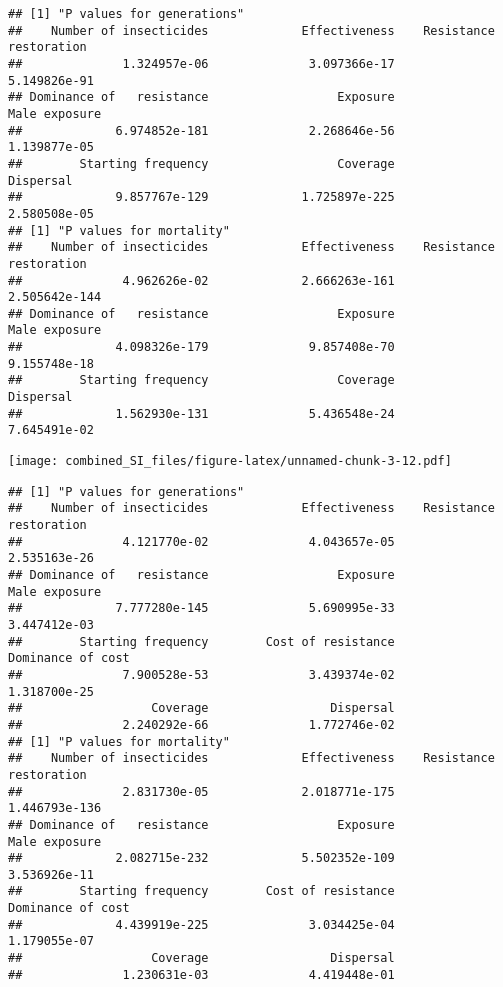 \documentclass[
]{article}
\begin{document}
\begin{verbatim}
## [1] "P values for generations"
##    Number of insecticides             Effectiveness    Resistance restoration 
##              1.324957e-06              3.097366e-17              5.149826e-91 
## Dominance of   resistance                  Exposure             Male exposure 
##             6.974852e-181              2.268646e-56              1.139877e-05 
##        Starting frequency                  Coverage                 Dispersal 
##             9.857767e-129             1.725897e-225              2.580508e-05 
## [1] "P values for mortality"
##    Number of insecticides             Effectiveness    Resistance restoration 
##              4.962626e-02             2.666263e-161             2.505642e-144 
## Dominance of   resistance                  Exposure             Male exposure 
##             4.098326e-179              9.857408e-70              9.155748e-18 
##        Starting frequency                  Coverage                 Dispersal 
##             1.562930e-131              5.436548e-24              7.645491e-02
\end{verbatim}

\texttt{[image: combined\_SI\_files/figure-latex/unnamed-chunk-3-12.pdf]}

\begin{verbatim}
## [1] "P values for generations"
##    Number of insecticides             Effectiveness    Resistance restoration 
##              4.121770e-02              4.043657e-05              2.535163e-26 
## Dominance of   resistance                  Exposure             Male exposure 
##             7.777280e-145              5.690995e-33              3.447412e-03 
##        Starting frequency        Cost of resistance         Dominance of cost 
##              7.900528e-53              3.439374e-02              1.318700e-25 
##                  Coverage                 Dispersal 
##              2.240292e-66              1.772746e-02 
## [1] "P values for mortality"
##    Number of insecticides             Effectiveness    Resistance restoration 
##              2.831730e-05             2.018771e-175             1.446793e-136 
## Dominance of   resistance                  Exposure             Male exposure 
##             2.082715e-232             5.502352e-109              3.536926e-11 
##        Starting frequency        Cost of resistance         Dominance of cost 
##             4.439919e-225              3.034425e-04              1.179055e-07 
##                  Coverage                 Dispersal 
##              1.230631e-03              4.419448e-01
\end{verbatim}
\end{document}

